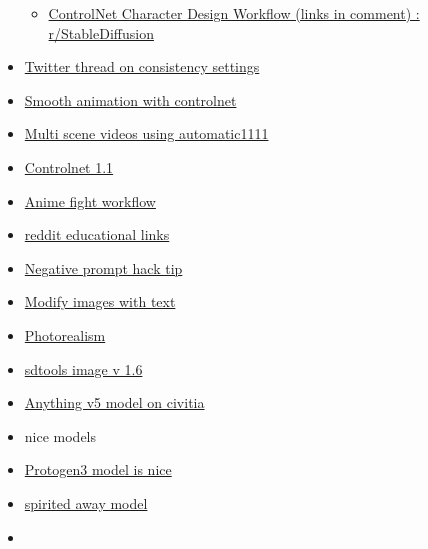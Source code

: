 \begin{itemize}
\begin{itemize}
  \item
    \href{https://www.reddit.com/r/StableDiffusion/comments/11rfol4/controlnet_character_design_workflow_links_in/}{ControlNet
    Character Design Workflow (links in comment) : r/StableDiffusion}
  \end{itemize}
\item
  \href{https://twitter.com/TomLikesRobots/status/1628100062910857217}{Twitter
  thread on consistency settings}
\item
  \href{https://www.reddit.com/r/StableDiffusion/comments/125m56z/smooth_animation_with_controlnet_and_regional/}{Smooth
  animation with controlnet}
\item
  \href{https://www.reddit.com/r/StableDiffusion/comments/127wub7/to_make_a_video_with_multiple_scenes_using_only/}{Multi
  scene videos using automatic1111}
\item
  \href{https://www.reddit.com/r/StableDiffusion/comments/12o8qm3/finally_installed_the_newer_controlnet_models_a/}{Controlnet
  1.1}
\item
  \href{https://www.reddit.com/r/StableDiffusion/comments/12z6rh5/half_real_converting_cowboy_bebop_spike_vs/}{Anime
  fight workflow}
\item
  \href{https://www.reddit.com/r/StableDiffusion/comments/116ki29/comment/j97jac3/}{reddit
  educational links}
\item
  \href{https://www.reddit.com/r/StableDiffusion/comments/11pcsxe/just_discovered_a_useful_trick_for_getting_good/}{Negative
  prompt hack tip}
\item
  \href{https://github.com/justinpinkney/stable-diffusion/blob/main/notebooks/imagic.ipynb}{Modify
  images with text}
\item
  \href{https://www.reddit.com/r/StableDiffusion/comments/11u2p0u/lazy_guide_to_photorealistic_images/}{Photorealism}
\item
  \href{https://www.reddit.com/r/StableDiffusion/comments/127gck9/sdtools_v16/}{sdtools
  image v 1.6}
\item
  \href{https://civitai.com/models/9409/anything-v5-or-anything-diffusion-original}{Anything
  v5 model on civitia}
\item
  nice models
\item
  \href{https://www.reddit.com/r/StableDiffusion/comments/100tp0v/protogenx34_has_absolutely_amazing_detail/}{Protogen3
  model is nice}
\item
  \href{https://civitai.com/models/5378/spirited-away-general-model-15}{spirited
  away model}
\item

\end{itemize}
